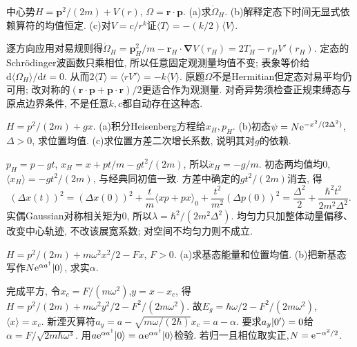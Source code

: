 \begin{exercise}
中心势$H=\boldsymbol p^2/(2m)+V(r)$, $\Omega=\boldsymbol r\cdot\boldsymbol p$. (a)求$\dot\Omega_H$. (b)解释定态下时间无显式依赖算符的均值恒定. (c)对$V=c/r^k$证$\langle T\rangle=-(k/2)\langle V\rangle$.
\end{exercise}
\begin{solution}
逐方向应用对易规则得$\dot\Omega_H=\boldsymbol p_H^2/m-\boldsymbol r_H\cdot\boldsymbol\nabla V(r_H)=2T_H-r_HV'(r_H)$. 定态的Schrödinger波函数只乘相位, 所以任意固定观测量均值不变; 表象等价给$\mathrm d\langle\Omega_H\rangle/\mathrm dt=0$. 从而$2\langle T\rangle=\langle rV'\rangle=-k\langle V\rangle$. 原题$\Omega$不是Hermitian但定态对易平均仍可用; 改对称的$(\boldsymbol r\cdot\boldsymbol p+\boldsymbol p\cdot\boldsymbol r)/2$更适合作为观测量. 对奇异势须检查正规束缚态与原点边界条件, 不是任意$k,c$都自动存在这种态.
\end{solution}
\begin{exercise}
$H=p^2/(2m)+gx$. (a)积分Heisenberg方程给$x_H,p_H$. (b)初态$\psi=N\mathrm e^{-x^2/(2\Delta^2)}$,$\Delta>0$, 求位置均值. (c)求位置方差二次增长系数, 说明其对$g$的依赖.
\end{exercise}
\begin{solution}
$p_H=p-gt$, $x_H=x+pt/m-gt^2/(2m)$, 所以$\ddot x_H=-g/m$. 初态两均值均0, $\langle x_H\rangle=-gt^2/(2m)$, 与经典同初值一致. 方差中确定的$gt^2/(2m)$消去, 得
\[
(\Delta x(t))^2=(\Delta x(0))^2+\frac{t}{m}\langle xp+px\rangle_0+\frac{t^2}{m^2}(\Delta p(0))^2
=\frac{\Delta^2}{2}+\frac{\hbar^2t^2}{2m^2\Delta^2}.
\]
实偶Gaussian对称相关矩为0, 所以$\lambda=\hbar^2/(2m^2\Delta^2)$. 均匀力只加整体动量偏移、改变中心轨迹, 不改该展宽系数; 对空间不均匀力则不成立.
\end{solution}
\begin{exercise}
$H=p^2/(2m)+m\omega^2x^2/2-Fx$, $F>0$. (a)求基态能量和位置均值. (b)把新基态写作$N\mathrm e^{\alpha a^\dagger}\lvert 0\rangle$, 求实$\alpha$.
\end{exercise}
\begin{solution}
完成平方, 令$x_c=F/(m\omega^2)$,$y=x-x_c$, 得$H=p^2/(2m)+m\omega^2y^2/2-F^2/(2m\omega^2)$. 故$E_g=\hbar\omega/2-F^2/(2m\omega^2)$, $\langle x\rangle=x_c$. 新湮灭算符$a_y=a-\sqrt{m\omega/(2\hbar)}x_c=a-\alpha$. 要求$a_y\lvert 0'\rangle=0$给$\alpha=F/\sqrt{2m\hbar\omega^3}$. 用$a\mathrm e^{\alpha a^\dagger}\lvert 0\rangle=\alpha\mathrm e^{\alpha a^\dagger}\lvert 0\rangle$检验. 若归一且相位取实正,$N=\mathrm e^{-\alpha^2/2}$.
\end{solution}
